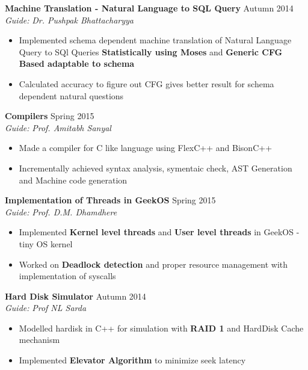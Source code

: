 \documentclass[11pt]{article} %
\begin{document}
\noindent \textbf{Machine Translation - Natural Language to SQL Query} \hfill Autumn 2014 \vspace{-0.5mm}\\
\textit{Guide:} \textit{Dr. Pushpak Bhattacharyya}
\vspace{-4mm}
\begin{itemize}
\itemsep-0.4em
\item Implemented schema dependent machine translation of Natural Language Query to SQl Queries \textbf{Statistically using Moses} and \textbf{Generic CFG Based adaptable to schema}
\item Calculated accuracy to figure out CFG gives better result
for schema dependent natural questions
\end{itemize}
\vspace{-3mm}

\noindent \textbf{Compilers} \hfill Spring 2015 \vspace{-0.5mm}\\
\textit{Guide:} \textit{Prof. Amitabh Sanyal}
\vspace{-4mm}
\begin{itemize}
\itemsep-0.4em
\item Made a compiler for C like language using FlexC++ and BisonC++
\item Incrementally achieved syntax analysis, symentaic check, AST Generation and Machine code generation
\end{itemize}
\vspace{-3mm}


\noindent \textbf{Implementation of Threads in GeekOS} \hfill Spring 2015 \vspace{-0.5mm}\\
\textit{Guide:} \textit{Prof. D.M. Dhamdhere}
\vspace{-4mm}
\begin{itemize}
\itemsep-0.4em
\item Implemented \textbf{Kernel level threads} and \textbf{User level threads} in GeekOS - tiny OS kernel
\item Worked on \textbf{Deadlock detection} and proper resource management with implementation of syscalls
\end{itemize}
\vspace{-3mm}

\noindent \textbf{Hard Disk Simulator} \hfill Autumn 2014 \vspace{-0.5mm}\\
\textit{Guide:} \textit{Prof NL Sarda}
\vspace{-4mm}
\begin{itemize}
\itemsep-0.4em
\item Modelled hardisk in C++ for simulation with \textbf{RAID 1} and HardDisk Cache mechanism
\item Implemented \textbf{Elevator Algorithm}  to minimize seek latency
\end{itemize}
\vspace{-3mm}
\end{document}
